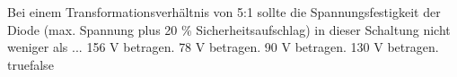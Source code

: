     {Bei einem Transformationsverhältnis von 5:1 sollte die Spannungsfestigkeit der Diode (max. Spannung plus 20 \% Sicherheitsaufschlag) in dieser Schaltung nicht weniger als ...}
    {156 V betragen.}
    {78 V betragen.}
    {90 V betragen.}
    {130 V betragen.}
    {true}{false}